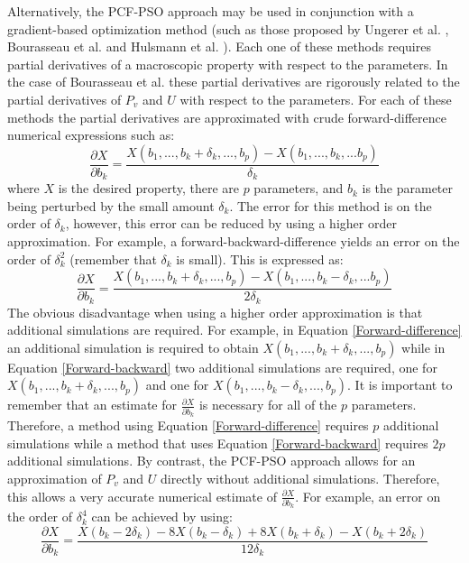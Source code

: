 \documentclass[12pt]{article}
\begin{document}
Alternatively, the PCF-PSO approach may be used in conjunction with a gradient-based optimization method (such as those proposed by Ungerer et al. \cite{AUA3}, Bourasseau et al. \cite{AUA4} and Hulsmann et al. \cite{GROW}). Each one of these methods requires partial derivatives of a macroscopic property with respect to the parameters. In the case of Bourasseau et al. these partial derivatives are rigorously related to the partial derivatives of $P_v$ and $U$ with respect to the parameters. For each of these methods the partial derivatives are approximated with crude forward-difference numerical expressions such as:
\begin{equation} \label{Forward-difference}
\frac{\partial X}{\partial b_k} = \frac{X(b_1,...,b_k + \delta_k,...,b_p) - X(b_1,...,b_k,...b_p)}{\delta_k}
\end{equation}
where $X$ is the desired property, there are $p$ parameters, and $b_k$ is the parameter being perturbed by the small amount $\delta_k$. The error for this method is on the order of $\delta_k$, however, this error can be reduced by using a higher order approximation. For example, a forward-backward-difference yields an error on the order of $\delta_k^2$ (remember that $\delta_k$ is small). This is expressed as:
\begin{equation} \label{Forward-backward}
\frac{\partial X}{\partial b_k} = \frac{X(b_1,...,b_k + \delta_k,...,b_p) - X(b_1,...,b_k - \delta_k,...b_p)}{2 \delta_k}
\end{equation}
The obvious disadvantage when using a higher order approximation is that additional simulations are required. For example, in Equation \ref{Forward-difference} an additional simulation is required to obtain $X(b_1,...,b_k + \delta_k,...,b_p)$ while in Equation \ref{Forward-backward} two additional simulations are required, one for $X(b_1,...,b_k + \delta_k,...,b_p)$ and one for $X(b_1,...,b_k - \delta_k,...,b_p)$. It is important to remember that an estimate for $\frac{\partial X}{\partial b_k}$ is necessary for all of the $p$ parameters. Therefore, a method using Equation \ref{Forward-difference} requires $p$ additional simulations while a method that uses Equation \ref{Forward-backward} requires $2 p$ additional simulations. By contrast, the PCF-PSO approach allows for an approximation of $P_v$ and $U$ directly without additional simulations. Therefore, this allows a very accurate numerical estimate of $\frac{\partial X}{\partial b_k}$. For example, an error on the order of $\delta_k^4$ can be achieved by using:
\begin{equation} \label{Fourth-order}
\frac{\partial X}{\partial b_k} = \frac{X(b_k - 2 \delta_k) - 8 X(b_k - \delta_k) + 8 X(b_k + \delta_k) - X(b_k + 2 \delta_k)}{12 \delta_k}
\end{equation}
\end{document}
